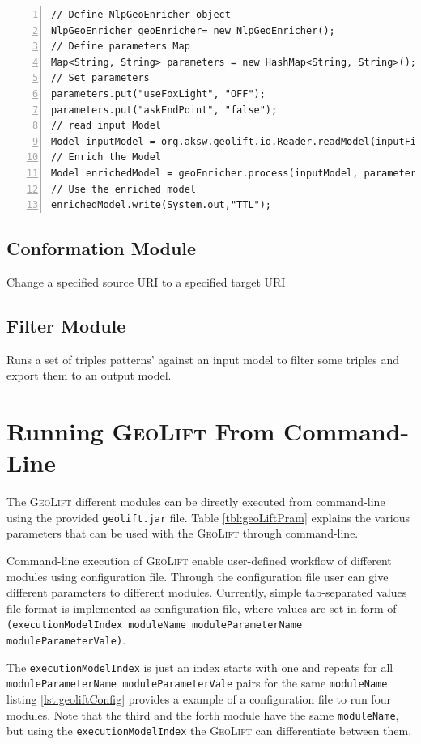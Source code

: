 \documentclass[a4paper,twoside,bibtotoc,abstracton,12pt,BCOR=15mm]{article}
\newcommand{\geolift}{\textsc{GeoLift}\xspace}
\begin{document}
\begin{lstlisting}[label=lst:NlpGeoEnricher, numbers=left, numberstyle=\tiny, caption = Code fragment to call the \texttt{NlpGeoEnricher} class.]
// Define NlpGeoEnricher object
NlpGeoEnricher geoEnricher= new NlpGeoEnricher();
// Define parameters Map
Map<String, String> parameters = new HashMap<String, String>();
// Set parameters
parameters.put("useFoxLight", "OFF");
parameters.put("askEndPoint", "false");
// read input Model
Model inputModel = org.aksw.geolift.io.Reader.readModel(inputFileValue);
// Enrich the Model
Model enrichedModel = geoEnricher.process(inputModel, parameters);
// Use the enriched model
enrichedModel.write(System.out,"TTL");

\end{lstlisting}
 

\subsection{Conformation Module}
Change a specified source URI to a specified target URI

\subsection{Filter Module}
Runs a set of triples patterns' against an input model to filter some triples and export them to an output model.  

\section{Running \geolift From Command-Line }

The \geolift different modules can be directly executed from command-line using the provided \texttt{geolift.jar} file.
Table \ref{tbl:geoLiftPram} explains the various parameters that can be used with the \geolift through command-line. 

Command-line execution of \geolift enable user-defined workflow of different modules using configuration file.
Through the configuration file user can give different parameters to different modules.
Currently, simple tab-separated values file format is implemented as configuration file, 
where values are set in form of \texttt{(executionModelIndex moduleName moduleParameterName moduleParameterVale)}.

The \texttt{executionModelIndex} is just an index starts with one and repeats for all \texttt{moduleParameterName moduleParameterVale} pairs for the same \texttt{moduleName}.
listing \ref{lst:geoliftConfig} provides a example of a configuration file to run four modules.
Note that the third and the forth module have the same \texttt{moduleName}, but using the \texttt{executionModelIndex} the \geolift can differentiate between them.
\end{document}
